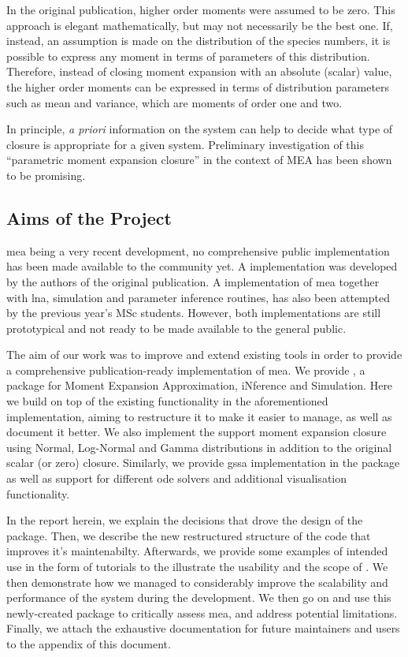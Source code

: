 In the original publication\cite{ale_general_2013}, higher order moments were assumed to be zero. 
This approach is elegant mathematically, but may not necessarily be the best one.
If, instead, an assumption is made on the distribution of the species numbers, it is possible
to express any moment in terms of parameters of this distribution\cite{milner_moment_2011}.
Therefore, instead of closing moment expansion with an absolute (scalar) value, the higher order moments can be expressed in
terms of distribution parameters such as mean and variance, which are moments of order one and two.

In principle, \emph{a priori} information on the system can help to decide what type of closure is appropriate for a given system.
Preliminary investigation of this ``parametric moment expansion closure'' in the context of MEA has been shown to be promising\cite{lakatos_preparation_2014}.

\subsection{Aims of the Project}

\gls{mea} being a very recent development, no comprehensive public implementation has been made available to the community yet.
A \mat{} implementation was developed by the authors of the original publication. A \py{} implementation of \gls{mea} together with \gls{lna}, simulation and parameter inference routines, has also been attempted by the previous year's MSc students\cite{babtie_moment_2013}.
However, both implementations are still prototypical and not ready to be made available to the general public.
 
The aim of our work was to improve and extend existing tools in order to provide a comprehensive publication-ready implementation of \gls{mea}.
We provide \means{}, a \py{} package for Moment Expansion Approximation, iNference and Simulation. 
Here we build on top of the existing functionality in the aforementioned \py{} implementation, aiming to restructure it to make it easier to manage, as well as document it better. 
We also implement the support moment expansion closure using Normal, Log-Normal and Gamma distributions in addition to the original scalar (or zero) closure. Similarly, we provide \gls{gssa} implementation in the package as well as support for different \gls{ode} solvers and additional visualisation functionality.

In the report herein, we explain the decisions that drove the design of the package.
Then, we describe the new restructured structure of the code that improves it's maintenabilty.
Afterwards, we provide some examples of intended use in the form of tutorials to the illustrate the usability and the scope of \means.
We then demonstrate how we managed to considerably improve the scalability and performance of the system during the development.
We then go on and use this newly-created package to critically assess \gls{mea}, and address potential limitations.
Finally, we attach the exhaustive documentation for future maintainers and users to the appendix of this document.
